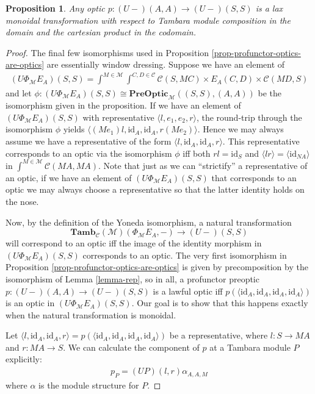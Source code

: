\documentclass[11pt,a4paper]{article}
\theoremstyle{plain}
\newtheorem{proposition}[theorem]{Proposition}
\theoremstyle{definition}
\newcommand{\C}{\mathscr{C}}
\newcommand{\M}{\mathscr{M}}
\newcommand{\Pastro}{\Phi}
\newcommand{\PreOptic}{\mathbf{PreOptic}}
\newcommand{\Tamb}{\mathbf{Tamb}}
\newcommand{\id}{\mathrm{id}}
\begin{document}
\begin{proposition}
Any optic $p : (U-)(A,A) \to (U-)(S,S)$ is a lax monoidal transformation with respect to Tambara module composition in the domain and the cartesian product in the codomain.
\end{proposition}
\begin{proof}
The final few isomorphisms used in Proposition \ref{prop-profunctor-optics-are-optics} are essentially window dressing. Suppose we have an element of 
\begin{align*}
(U\Pastro_\M E_A)(S,S) = \int^{M \in \M} \int^{C,D \in \C} \C(S, MC) \times E_A(C,D) \times \C(MD,S)
\end{align*}
and let $\phi : (U\Pastro_\M E_A)(S,S) \cong \PreOptic_\M((S, S), (A, A))$ be the isomorphism given in the proposition. If we have an element of $(U\Pastro_\M E_A)(S,S)$ with representative $\langle l, e_1, e_2, r \rangle$, the round-trip through the isomorphism $\phi$ yields $\langle (M e_1)l, \id_A, \id_A, r(M e_2)\rangle$. Hence we may always assume we have a representative of the form $\langle l, \id_A, \id_A, r \rangle$. This representative corresponds to an optic via the isomorphism $\phi$ iff both $rl = \id_S$ and $\langle lr\rangle = \langle \id_{NA} \rangle$ in $\int^{M \in \M} \C(M A, M A)$. Note that just as we can ``strictify'' a representative of an optic, if we have an element of $(U\Pastro_\M E_A)(S,S)$ that corresponds to an optic we may always choose a representative so that the latter identity holds on the nose.

Now, by the definition of the Yoneda isomorphism, a natural transformation \[ \Tamb_\C(\M)(\Pastro_\M E_A, -) \to (U-)(S,S) \] will correspond to an optic iff the image of the identity morphism in $(U\Pastro_\M E_A)(S, S)$ corresponds to an optic. The very first isomorphism in Proposition \ref{prop-profunctor-optics-are-optics} is given by precomposition by the isomorphism of Lemma \ref{lemma-rep}, so in all, a profunctor preoptic $p : (U-)(A, A) \to (U-)(S,S)$ is a lawful optic iff $p(\langle \id_A, \id_A, \id_A, \id_A \rangle)$ is an optic in $(U\Pastro_\M E_A)(S, S)$. Our goal is to show that this happens exactly when the natural transformation is monoidal.

Let $\langle l, \id_A, \id_A, r \rangle = p(\langle \id_A, \id_A, \id_A, \id_A \rangle)$ be a representative, where $l : S \to M A$ and $r : M A \to S$. We can calculate the component of $p$ at a Tambara module $P$ explicitly:
\begin{align*}
p_P = (UP)(l,r) \alpha_{A,A,M}
\end{align*}
where $\alpha$ is the module structure for $P$.


\end{proof}
\end{document}
